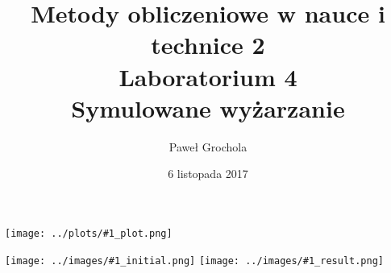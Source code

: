\documentclass{article}
\title{ \textbf{Metody obliczeniowe w nauce i technice 2} \\ Laboratorium 4 \\ Symulowane wyżarzanie}
\author{
Paweł Grochola
}
\date {6 listopada 2017}
\begin{document}
    \newcommand{\bigplot}[1]{
        \begin{minipage}{\textwidth}
            \begin{minipage}{.7\linewidth}
                \texttt{[image: ../plots/\#1\_plot.png]}
            \end{minipage}%
            \begin{minipage}{.3\linewidth}
                \texttt{[image: ../images/\#1\_initial.png]}
                \texttt{[image: ../images/\#1\_result.png]}
            \end{minipage}
        \end{minipage}
    }
   
\maketitle

\bigplot{crystal_1sf_03_10000_Cross_exp00001_500000}
%
%
%
%
\end{document}
